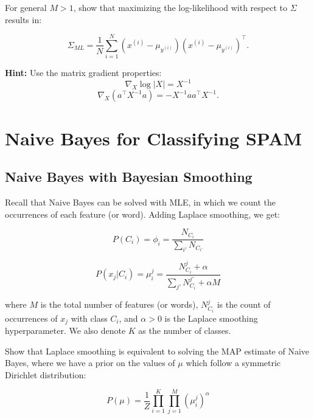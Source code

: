 \documentclass[lang=cn,11pt]{elegantbook}
\begin{document}
For general $M > 1$, show that maximizing the log-likelihood with respect to $\Sigma$ results in:

\begin{equation}
    \Sigma_{ML} = \frac{1}{N} \sum_{i=1}^{N} (x^{(i)} - \mu_{y^{(i)}})(x^{(i)} - \mu_{y^{(i)}})^\top.
\end{equation}

\textbf{Hint:} Use the matrix gradient properties:
\begin{equation}
    \nabla_X \log |X| = X^{-1}
\end{equation}
\begin{equation}
    \nabla_X (a^\top X^{-1} a) = -X^{-1} a a^\top X^{-1}.
\end{equation}



\section{Naive Bayes for Classifying SPAM}

\subsection{Naive Bayes with Bayesian Smoothing}

Recall that Naive Bayes can be solved with MLE, in which we count the occurrences of each feature (or word). Adding Laplace smoothing, we get:

\begin{equation}
    P(C_i) = \phi_i = \frac{N_{C_i}}{\sum_{i'} N_{C_{i'}}}
\end{equation}

\begin{equation}
    P(x_j | C_i) = \mu_i^j = \frac{N_{C_i}^j + \alpha}{\sum_{j'} N_{C_i}^{j'} + \alpha M}
\end{equation}

where $M$ is the total number of features (or words), $N_{C_i}^j$ is the count of occurrences of $x_j$ with class $C_i$, and $\alpha > 0$ is the Laplace smoothing hyperparameter. We also denote $K$ as the number of classes.

Show that Laplace smoothing is equivalent to solving the MAP estimate of Naive Bayes, where we have a prior on the values of $\mu$ which follow a symmetric Dirichlet distribution:

\begin{equation}
    P(\mu) = \frac{1}{Z} \prod_{i=1}^{K} \prod_{j=1}^{M} (\mu_i^j)^\alpha
\end{equation}
\end{document}
